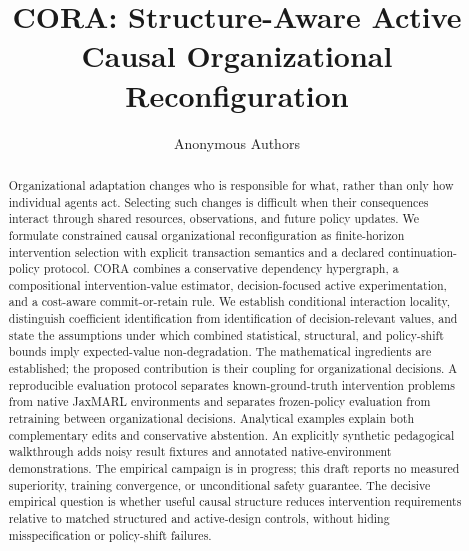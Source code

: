 \documentclass[runningheads]{llncs}
\begin{document}
\title{CORA: Structure-Aware Active Causal Organizational Reconfiguration}
\author{Anonymous Authors}
\maketitle
\begin{abstract}
    Organizational adaptation changes who is responsible for what, rather than only how individual agents act. Selecting such changes is difficult when their consequences interact through shared resources, observations, and future policy updates. We formulate constrained causal organizational reconfiguration as finite-horizon intervention selection with explicit transaction semantics and a declared continuation-policy protocol. CORA combines a conservative dependency hypergraph, a compositional intervention-value estimator, decision-focused active experimentation, and a cost-aware commit-or-retain rule. We establish conditional interaction locality, distinguish coefficient identification from identification of decision-relevant values, and state the assumptions under which combined statistical, structural, and policy-shift bounds imply expected-value non-degradation. The mathematical ingredients are established; the proposed contribution is their coupling for organizational decisions. A reproducible evaluation protocol separates known-ground-truth intervention problems from native JaxMARL environments and separates frozen-policy evaluation from retraining between organizational decisions. Analytical examples explain both complementary edits and conservative abstention. An explicitly synthetic pedagogical walkthrough adds noisy result fixtures and annotated native-environment demonstrations. The empirical campaign is in progress; this draft reports no measured superiority, training convergence, or unconditional safety guarantee. The decisive empirical question is whether useful causal structure reduces intervention requirements relative to matched structured and active-design controls, without hiding misspecification or policy-shift failures.
\end{abstract}
\end{document}
